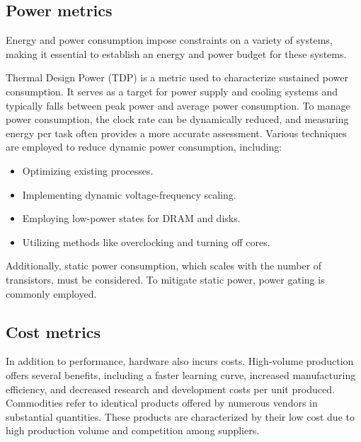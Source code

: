 \subsection{Power metrics}
Energy and power consumption impose constraints on a variety of systems, making it essential to establish an energy and power budget for these systems.

Thermal Design Power (TDP) is a metric used to characterize sustained power consumption. 
It serves as a target for power supply and cooling systems and typically falls between peak power and average power consumption. 
To manage power consumption, the clock rate can be dynamically reduced, and measuring energy per task often provides a more accurate assessment. 
Various techniques are employed to reduce dynamic power consumption, including:
\begin{itemize}
    \item Optimizing existing processes.
    \item Implementing dynamic voltage-frequency scaling.
    \item Employing low-power states for DRAM and disks.
    \item Utilizing methods like overclocking and turning off cores.
\end{itemize}
Additionally, static power consumption, which scales with the number of transistors, must be considered. 
To mitigate static power, power gating is commonly employed.

\subsection{Cost metrics}
In addition to performance, hardware also incurs costs. 
High-volume production offers several benefits, including a faster learning curve, increased manufacturing efficiency, and decreased research and development costs per unit produced. 
Commodities refer to identical products offered by numerous vendors in substantial quantities. 
These products are characterized by their low cost due to high production volume and competition among suppliers.

